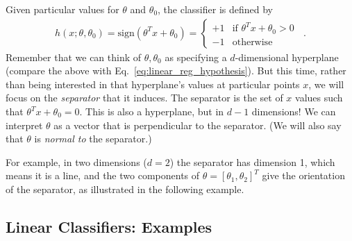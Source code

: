 Given particular values for $\theta$ and $\theta_0$, the classifier is
defined by
\begin{eqnarray*}
  h(x; \theta, \theta_0) = \text{sign}(\theta^T x + \theta_0)
  = \begin{cases} +1 & \text{if $\theta^Tx + \theta_0 > 0$} \\ -1 &
              \text{otherwise}\end{cases} \;\;.
\end{eqnarray*}
Remember that we can think of $\theta, \theta_0$ as specifying a
$d$-dimensional hyperplane (compare the above with
Eq.~\ref{eq:linear_reg_hypothesis}).  But this time, rather than
being interested in that hyperplane's values at particular points $x$,
we will focus on the {\em separator} that it induces.  The separator
is the set of $x$ values such that $\theta^T x + \theta_0 = 0$.  This
is also a hyperplane, but in $d-1$ dimensions!
We can interpret $\theta$ as a
vector that is perpendicular to the separator.  (We will also say
that $\theta$ is {\em normal to} the separator.)

For example, in two dimensions ($d=2$) the separator has dimension 1,
which means it is a line, and
the two components of $\theta = [\theta_1, \theta_2]^T$ give the orientation
of the separator, as illustrated in the following example.

\subsection{Linear Classifiers: Examples}


